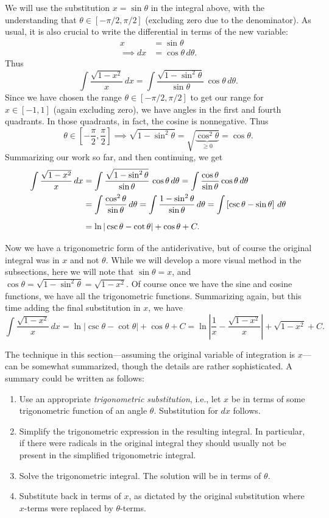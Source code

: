 We will use the substitution $x=\sin\theta$ in the integral above,
with the understanding that $\theta\in[-\pi/2,\pi/2]$ (excluding zero
due to the denominator).  As usual, it is also crucial to write 
the differential in terms of the new variable:
\begin{align*}
x&=\sin\theta\\
\implies dx&=\cos\theta\,d\theta.\end{align*}
Thus
$$\int\frac{\sqrt{1-x^2}}x\,dx
=\int\frac{\sqrt{1-\sin^2\theta}}{\sin\theta}\,\cos\theta\,d\theta.$$
Since we have chosen the range $\theta\in[-\pi/2,\pi/2]$ to get
our range for $x\in[-1,1]$ (again excluding zero), we have
angles in the first and fourth quadrants.  In those quadrants, in
fact, the cosine is nonnegative.  Thus
$$\theta\in\left[-\frac{\pi}2,\frac{\pi}2\right]
\implies\sqrt{1-\sin^2\theta}=\sqrt{\underbrace{\cos^2\theta}_{\ge0}}
=\cos\theta.$$
Summarizing our work so far, and then continuing, we get
\begin{align*}
\int\frac{\sqrt{1-x^2}}x\,dx
&=\int\frac{\sqrt{1-\sin^2\theta}}{\sin\theta}\,\cos\theta\,d\theta
=\int\frac{\cos\theta}{\sin\theta}\cos\theta\,d\theta\\
&=\int\frac{\cos^2\theta}{\sin\theta}\,d\theta
=\int\frac{1-\sin^2\theta}{\sin\theta}\,d\theta
=\int\left[\csc\theta-\sin\theta\right]\,d\theta\\ \vphantom{\int}
&=\ln|\csc\theta-\cot\theta|+\cos\theta+C.
\end{align*}
Now we have a trigonometric form of the antiderivative, but of course
the original integral was in $x$ and not $\theta$.  While we will
develop a more visual method in the subsections, here we will note that
$\sin\theta=x$, and $\cos\theta=\sqrt{1-\sin^2\theta}=\sqrt{1-x^2}$.
Of course once we have the sine and cosine functions, we have all
the trigonometric functions.  Summarizing again, but this time
adding the final substitution in $x$, we have
$$\int\frac{\sqrt{1-x^2}}x\,dx
=\ln|\csc\theta-\cot\theta|+\cos\theta+C
=\ln\left|\frac1x-\frac{\sqrt{1-x^2}}x\right|+\sqrt{1-x^2}+C.$$
\eex

The technique in this section---assuming the original
variable of integration is $x$---can be somewhat summarized, though
the details are rather sophisticated.  A summary could be
written as
follows:
\begin{enumerate}
\item Use an appropriate {\it trigonometric substitution}, i.e., 
let $x$ be in terms of some trigonometric function of an
angle $\theta$.  Substitution for $dx$ follows.
\item Simplify the trigonometric expression in the resulting 
integral.  In particular, if there were radicals
in the original integral they should usually not be present in the 
simplified trigonometric integral.
\item Solve the trigonometric integral.  The solution will be
in terms of $\theta$.
\item Substitute back in terms of $x$, as dictated by the 
original substitution where $x$-terms were replaced by $\theta$-terms.
\end{enumerate}

